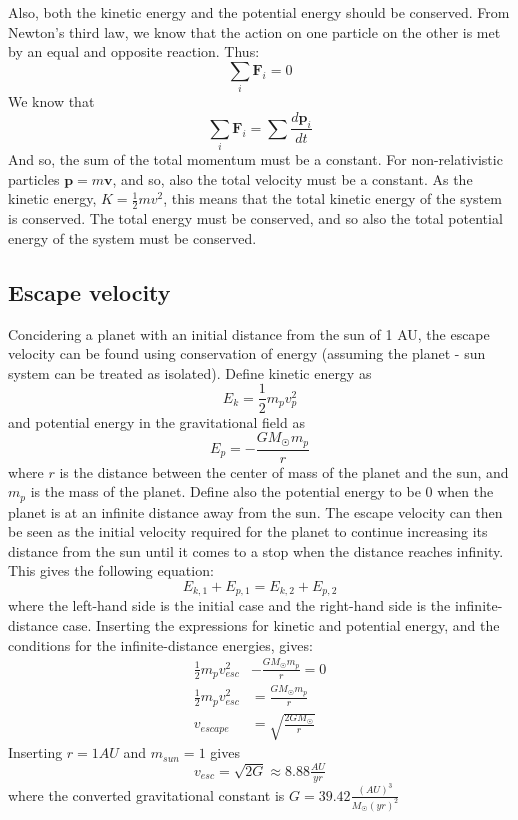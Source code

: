 Also, both the kinetic energy and the potential energy should be conserved. 
From Newton's third law, we know that the action on one particle on the other is met by an equal and opposite reaction. Thus:
\begin{equation}
\sum_i \mathbf{F}_i  = 0
\end{equation}
We know that 
\begin{equation}
\sum_i \mathbf{F}_i = \sum\frac{d\mathbf{p}_i}{dt}
\end{equation}
And so, the sum of the total momentum must be a constant. For non-relativistic particles $\mathbf{p}= m\mathbf{v}$, and so, also the total velocity must be a constant. As the kinetic energy, $K = \frac{1}{2}mv^2$, this means that the total kinetic energy of the system is conserved. The total energy must be conserved, and so also the total potential energy of the system must be conserved. 
\subsection{Escape velocity}
Concidering a planet with an initial distance from the sun of 1 AU, the escape velocity can be
found using conservation of energy (assuming the planet - sun system can be treated as isolated).
Define kinetic energy as
$$E_k = \frac{1}{2}m_{p}v_{p}^2$$
and potential energy in the gravitational field as
$$E_p = -\frac{GM_{\astrosun}m_{p}}{r}$$
where $r$ is the distance between the center of mass of the planet and the sun, and $m_p$ is the
mass of the planet. Define also the potential
energy to be 0 when the planet is at an infinite distance away from the sun. The escape velocity can
then be seen as the initial velocity required for the planet to continue increasing its distance from
the sun until it comes to a stop when the distance reaches infinity. This gives the following
equation:
\begin{equation*}
E_{k,1} + E_{p,1} = E_{k,2} + E_{p,2}
\end{equation*}
where the left-hand side is the initial case and the right-hand side is the infinite-distance
case. Inserting the expressions for kinetic and potential energy, and the conditions for the
infinite-distance energies, gives:
\begin{align*}
\tfrac{1}{2}m_{p}v_{esc}^2 &- \frac{GM_{\astrosun}m_{p}}{r} = 0 \\
\tfrac{1}{2}m_{p}v_{esc}^2 &= \frac{GM_{\astrosun}m_{p}}{r} \\
v_{escape} &= \sqrt{\tfrac{2GM_{\astrosun}}{r}}
\end{align*}
Inserting $r = 1AU$ and $m_{sun} = 1$ gives 
\begin{equation}\label{eq:escape}
v_{esc} = \sqrt{2G} \approx 8.88\tfrac{AU}{yr}
\end{equation}
where the converted gravitational constant is $G = 39.42 \frac{(AU)^3}{M_{\astrosun}(yr)^2}$
